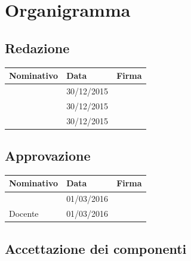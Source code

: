 \documentclass[12pt,a4paper]{article}
\begin{document}
\newpage

\appendix
\section{Organigramma}

\subsection{Redazione}

\begin{table}[H]
	\begin{center}
		\begin{tabular}{l l l}
			\toprule
            \textbf{Nominativo}	& \textbf{Data} & \textbf{Firma} \\ \midrule
			\midrule
			\TP & 30/12/2015 & \\ \midrule
			\NDC & 30/12/2015 & \\ \midrule
			\WS & 30/12/2015 & \\
			\bottomrule
		\end{tabular}
	\end{center}
\end{table}

\subsection{Approvazione}

\begin{table}[H]
	\begin{center}
		\begin{tabular}{l l l}
			\toprule
            \textbf{Nominativo}	& \textbf{Data} & \textbf{Firma} \\ \midrule
			\midrule
			\RE & 01/03/2016 & \\ \midrule
			Docente & 01/03/2016 & \\
			\bottomrule
		\end{tabular}
	\end{center}
\end{table}

\subsection{Accettazione dei componenti}
\end{document}
